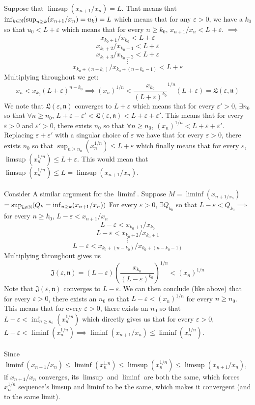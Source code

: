 \documentclass[../Main.tex]{subfiles}
\begin{document}
Suppose that $\limsup(x_{n+1}/x_n)=L$. That means that $\inf_{k \in \mathbb N}(\sup_{n \geq k}(x_{n+1}/x_n)=u_k)=L$ which means that for any $\varepsilon>0$, we have a $k_0$ so that $u_0<L+\varepsilon$ which means that for every $n \geq k_0$, $x_{n+1}/x_n < L+\varepsilon$. $\implies$
$$x_{k_0+1}/x_{k_0}<L+\varepsilon $$
$$x_{k_0+2}/x_{k_0+1}<L+\varepsilon $$
$$x_{k_0+3}/x_{k_0+2}<L+\varepsilon $$
$$\vdots$$
$$x_{k_0+(n-k_0)}/x_{k_0+(n-k_0-1)}<L+\varepsilon $$
Multiplying throughout we get:
$$x_{n}<x_{k_0}(L+\varepsilon)^{n-k_0} \implies (x_{n})^{1/n}<{\frac{x_{k_0}}{(L+\varepsilon)^{k_0}}}^{1/n}(L+\varepsilon)=\mathfrak{L(\varepsilon,n)} $$
We note that $\mathfrak{L(\varepsilon,n)}$ converges to $L+\varepsilon$ which means that for every $\varepsilon'>0$, $\exists n_0$ so that $\forall n \geq n_0$, $L+\varepsilon-\varepsilon'<\mathfrak{L(\varepsilon,n)}<L+\varepsilon+\varepsilon'$. This means that for every $\varepsilon>0$ and $\varepsilon'>0$, there exists $n_0$ so that $\forall n \geq n_0$, $(x_n)^{1/n}<L+\varepsilon+\varepsilon'$. Replacing $\varepsilon+\varepsilon'$ with a singular choice of $\varepsilon$ we have that for every $\varepsilon>0$, there exists $n_0$ so that $\sup_{n \geq n_0}(x_n^{1/n}) \leq L+\varepsilon$ which finally means that for every $\varepsilon$, $\limsup(x_{n}^{1/n})\leq L+\varepsilon$. This would mean that $\limsup(x_n^{1/n}) \leq L=\limsup(x_{n+1}/x_n)$.
\\\\ Consider A similar argument for the $\liminf$. Suppose $M=\liminf(x_{n+1/x_n})$ 
$=\sup_{k \in \mathbb N}(Q_k=\inf_{n \geq k}(x_{n+1}/x_n))$
For every $\varepsilon>0$, $\exists Q_{k_0}$ so that $L-\varepsilon<Q_{k_0} \implies$ for every $n \geq k_0$, $L-\varepsilon< x_{n+1}/x_{n}$
$$L-\varepsilon < x_{k_0+1}/x_{k_0}$$
$$L-\varepsilon<x_{k_0+2}/x_{k_0+1} $$
$$\vdots $$
$$L-\varepsilon<x_{k_0+(n-k_0)}/x_{k_0+(n-k_0-1)}$$
Multiplying throughout gives us 
$$\mathfrak{J(\varepsilon,n)}=(L-\varepsilon)(\frac{x_{k_0}}{(L-\varepsilon)^{k_0}})^{1/n}<(x_{n})^{1/n} $$
Note that $\mathfrak{J(\varepsilon,n)}$ converges to $L-\varepsilon$. We can then conclude (like above) that for every $\varepsilon>0$, there exists an $n_0$ so that $L-\varepsilon<(x_n)^{1/n}$ for every $n \geq n_0$. This means that for every $\varepsilon>0$, there exists an $n_0$ so that $L-\varepsilon<\inf_{n \geq n_0}(x_{n}^{1/n})$ which directly gives us that for every $\varepsilon>0$, $L-\varepsilon < \liminf(x_n^{1/n}) \implies \liminf(x_{n+1}/x_n)\leq \liminf(x_n^{1/n})$. 
\\\\ Since $\liminf(x_{n+1}/x_n) \leq \liminf(x_n^{1.n}) \leq \limsup(x_n^{1/n}) \leq \limsup(x_{n+1}/x_n)$, if $x_{n+1}/x_n$ converges, its $\limsup$ and $\liminf$ are both the same, which forces $x_n^{1/n}$ sequence's limsup and liminf to be the same, which makes it convergent (and to the same limit).
\end{document}
